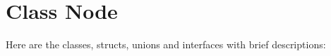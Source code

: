 \section{Class Node}
Here are the classes, structs, unions and interfaces with brief descriptions\+:\begin{DoxyCompactList}
\item{}
\item{}
\end{DoxyCompactList}
